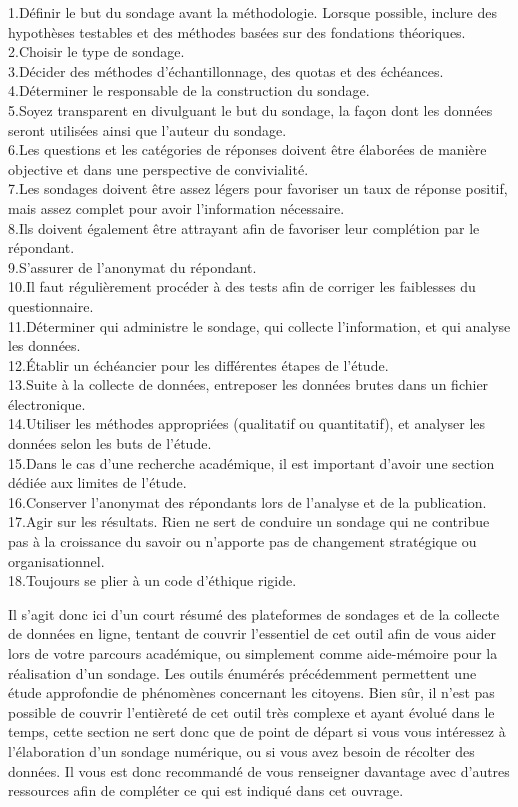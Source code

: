 \documentclass[
  letterpaper,
]{scrbook}
\begin{document}
\hfill\break
1.Définir le but du sondage avant la méthodologie. Lorsque possible,
inclure des hypothèses testables et des méthodes basées sur des
fondations théoriques.\\
2.Choisir le type de sondage.\\
3.Décider des méthodes d'échantillonnage, des quotas et des échéances.\\
4.Déterminer le responsable de la construction du sondage.\\
5.Soyez transparent en divulguant le but du sondage, la façon dont les
données seront utilisées ainsi que l'auteur du sondage.\\
6.Les questions et les catégories de réponses doivent être élaborées de
manière objective et dans une perspective de convivialité.\\
7.Les sondages doivent être assez légers pour favoriser un taux de
réponse positif, mais assez complet pour avoir l'information
nécessaire.\\
8.Ils doivent également être attrayant afin de favoriser leur complétion
par le répondant.\\
9.S'assurer de l'anonymat du répondant.\\
10.Il faut régulièrement procéder à des tests afin de corriger les
faiblesses du questionnaire.\\
11.Déterminer qui administre le sondage, qui collecte l'information, et
qui analyse les données.\\
12.Établir un échéancier pour les différentes étapes de l'étude.\\
13.Suite à la collecte de données, entreposer les données brutes dans un
fichier électronique.\\
14.Utiliser les méthodes appropriées (qualitatif ou quantitatif), et
analyser les données selon les buts de l'étude.\\
15.Dans le cas d'une recherche académique, il est important d'avoir une
section dédiée aux limites de l'étude.\\
16.Conserver l'anonymat des répondants lors de l'analyse et de la
publication.\\
17.Agir sur les résultats. Rien ne sert de conduire un sondage qui ne
contribue pas à la croissance du savoir ou n'apporte pas de changement
stratégique ou organisationnel.\\
18.Toujours se plier à un code d'éthique rigide.

Il s'agit donc ici d'un court résumé des plateformes de sondages et de
la collecte de données en ligne, tentant de couvrir l'essentiel de cet
outil afin de vous aider lors de votre parcours académique, ou
simplement comme aide-mémoire pour la réalisation d'un sondage. Les
outils énumérés précédemment permettent une étude approfondie de
phénomènes concernant les citoyens. Bien sûr, il n'est pas possible de
couvrir l'entièreté de cet outil très complexe et ayant évolué dans le
temps, cette section ne sert donc que de point de départ si vous vous
intéressez à l'élaboration d'un sondage numérique, ou si vous avez
besoin de récolter des données. Il vous est donc recommandé de vous
renseigner davantage avec d'autres ressources afin de compléter ce qui
est indiqué dans cet ouvrage.
\end{document}
